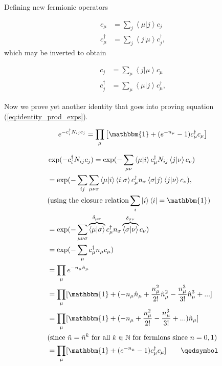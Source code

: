 \documentclass[10pt, twocolumn, twoside]{article}
\begin{document}
Defining new fermionic operators

\begin{equation}\label{eq:changeBasis1}
\begin{split}
c_\mu &= \sum_j \left\langle \mu | j \right\rangle c_j \\
c_\mu^\dagger &= \sum_j \left\langle j | \mu \right\rangle c_j^\dagger ,
\end{split}
\end{equation}
which may be inverted to obtain

\begin{equation}\label{eq:changeBasis2}
\begin{split}
c_j &= \sum_\mu \left\langle j | \mu \right\rangle c_\mu \\
c_j^\dagger &= \sum_\mu \left\langle \mu | j \right\rangle c_\mu^\dagger ,
\end{split}
\end{equation}

Now we prove yet another identity that goes into proving equation (\ref{eq:identity_prod_exps}).

\begin{equation}\label{eq:LHS_identity}
e^{-c_i^\dagger N_{ij} c_j} = \prod_\mu \big[ \mathbbm{1} + ( e^{-n_\mu} - 1 ) c_\mu^\dagger c_\mu \big]
\end{equation}

\begin{equation*}
\begin{split}
&\exp({-c_i^\dagger N_{ij} c_j}) = \exp({ - \sum_{\mu\nu} \left\langle \mu | i \right\rangle c_\mu^\dagger N_{ij} \left\langle j | \nu \right\rangle c_\nu }) \\
&= \exp({-\sum_{ij}\sum_{ \mu\nu\sigma} \left\langle \mu | i \right\rangle  \left\langle i | \sigma \right\rangle c_\mu^\dagger n_\sigma \left\langle \sigma | j \right\rangle \left\langle j | \nu \right\rangle c_\nu }) , \\
& \text{(using the closure relation} \sum_i \left| i \right\rangle \left\langle i \right|= \mathbbm{1} \text{)} \\
&= \exp({-\sum_{ \mu\nu\sigma} \overbrace{\left\langle \mu | \sigma \right\rangle}^{\delta_{\mu\sigma}}  c_\mu^\dagger n_\sigma \overbrace{\left\langle \sigma | \nu \right\rangle}^{\delta_{\sigma\nu}} c_\nu }) \\
&= \exp({-\sum_\mu c_\mu^\dagger n_\mu c_\mu}) \\
&= \prod_\mu e^{-n_\mu \hat{n}_\mu} \\
&= \prod_\mu [ \mathbbm{1} + ( - n_\mu \hat{n}_\mu + \frac{n_\mu^2}{2!} \hat{n}_\mu^2 - \frac{n_\mu^3}{3!} \hat{n}_\mu^3 + ... ] \\
&= \prod_\mu [ \mathbbm{1} + ( - n_\mu + \frac{n_\mu^2}{2!} - \frac{n_\mu^3}{3!} + ... ) \hat{n}_\mu ] \\
& \text{(since  } \hat{n} = \hat{n}^k \text{  for all  } k \in \mathbb{N} \text{  for fermions since  } n = 0, 1 ) \\
&= \prod_\mu [ \mathbbm{1} + ( e^{-n_\mu} - 1 ) c_\mu^\dagger c_\mu ] \quad\quad \qedsymbol
\end{split}
\end{equation*}
\end{document}
